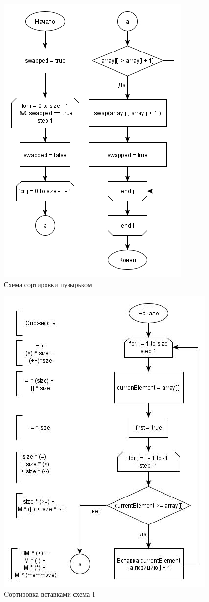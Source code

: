 \begin{figure}[H]
	\centering
	\includegraphics[width=0.7\linewidth]{../Рисунки/bubble}
	\caption{Схема сортировки пузырьком}
	\label{fig:bubble}
\end{figure}

\begin{figure}[H]
	\centering
	\includegraphics[width=0.7\linewidth]{../Рисунки/insertion1}
	\caption{Cортировка вставками схема 1}
	\label{fig:insertion}
\end{figure}

